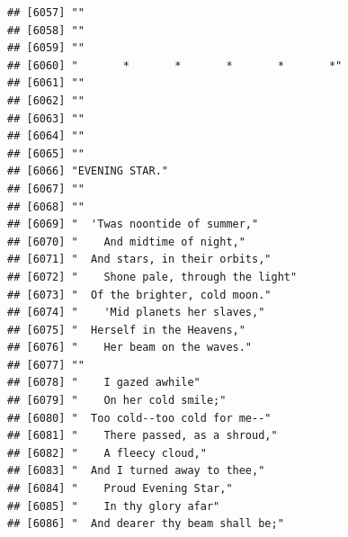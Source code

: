 \documentclass{article}\usepackage[]{graphicx}\usepackage[]{color}
\makeatletter
\newenvironment{kframe}{%
 \def\at@end@of@kframe{}%
 \ifinner\ifhmode%
  \def\at@end@of@kframe{\end{minipage}}%
  \begin{minipage}{\columnwidth}%
 \fi\fi%
 \def\FrameCommand##1{\hskip\@totalleftmargin \hskip-\fboxsep
 \colorbox{shadecolor}{##1}\hskip-\fboxsep
     \hskip-\linewidth \hskip-\@totalleftmargin \hskip\columnwidth}%
 \MakeFramed {\advance\hsize-\width
   \@totalleftmargin\z@ \linewidth\hsize
   \@setminipage}}%
 {\par\unskip\endMakeFramed%
 \at@end@of@kframe}
\newenvironment{knitrout}{}{} %
\makeatother
\begin{document}
\begin{knitrout}
\begin{kframe}
\begin{verbatim}
## [6057] ""                                                                            
## [6058] ""                                                                            
## [6059] ""                                                                            
## [6060] "       *       *       *       *       *"                                    
## [6061] ""                                                                            
## [6062] ""                                                                            
## [6063] ""                                                                            
## [6064] ""                                                                            
## [6065] ""                                                                            
## [6066] "EVENING STAR."                                                               
## [6067] ""                                                                            
## [6068] ""                                                                            
## [6069] "  'Twas noontide of summer,"                                                 
## [6070] "    And midtime of night,"                                                   
## [6071] "  And stars, in their orbits,"                                               
## [6072] "    Shone pale, through the light"                                           
## [6073] "  Of the brighter, cold moon."                                               
## [6074] "    'Mid planets her slaves,"                                                
## [6075] "  Herself in the Heavens,"                                                   
## [6076] "    Her beam on the waves."                                                  
## [6077] ""                                                                            
## [6078] "    I gazed awhile"                                                          
## [6079] "    On her cold smile;"                                                      
## [6080] "  Too cold--too cold for me--"                                               
## [6081] "    There passed, as a shroud,"                                              
## [6082] "    A fleecy cloud,"                                                         
## [6083] "  And I turned away to thee,"                                                
## [6084] "    Proud Evening Star,"                                                     
## [6085] "    In thy glory afar"                                                       
## [6086] "  And dearer thy beam shall be;"                                             

\end{verbatim}
\end{kframe}
\end{knitrout}
\end{document}
